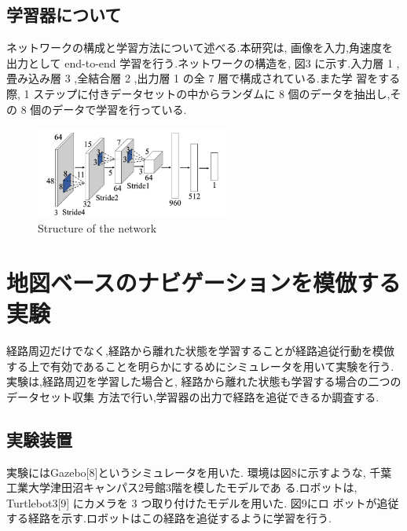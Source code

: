 \documentclass{jarticle}
\begin{document}
\subsection{学習器について}
ネットワークの構成と学習方法について述べる.本研究は,
画像を入力,角速度を出力として end-to-end 学習を行う.ネットワークの構造を, 図3
に示す.入力層 1 ,畳み込み層 3 ,全結合層 2 ,出力層 1 の全 7 層で構成されている.また学
習をする際, 1 ステップに付きデータセットの中からランダムに 8 個のデータを抽出し,その
8 個のデータで学習を行っている.


\begin{figure}[h!]
  \centering
   \includegraphics[height=30mm]{./figs/gaku2.png}
   \caption{Structure of the network}
\end{figure}


\section{地図ベースのナビゲーションを模倣する実験}

経路周辺だけでなく,経路から離れた状態を学習することが経路追従行動を模倣
する上で有効であることを明らかにするめにシミュレータを用いて実験を行う. 
実験は,経路周辺を学習した場合と, 経路から離れた状態も学習する場合の二つのデータセット収集
方法で行い,学習器の出力で経路を追従できるか調査する.

\subsection{実験装置}
実験にはGazebo[8]というシミュレータを用いた.
環境は図8に示すような, 千葉工業大学津田沼キャンパス2号館3階を模したモデルであ
る.ロボットは,  Turtlebot3[9] にカメラを 3 つ取り付けたモデルを用いた. 図9にロ
ボットが追従する経路を示す.ロボットはこの経路を追従するように学習を行う.
\end{document}
